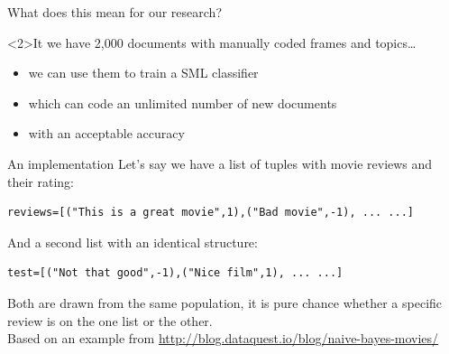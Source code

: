 \documentclass{beamer}
\begin{document}
\begin{frame}[plain]
\begin{columns}[]
\end{columns}

\end{frame}





\begin{frame}{What does this mean for our research?}
\begin{block}<2>{It we have 2,000 documents with manually coded frames and topics\ldots}
\begin{itemize}
\item we can use them to train a SML classifier
\item which can code an unlimited number of new documents
\item with an acceptable accuracy
\end{itemize}
\end{block}
\end{frame}




\begin{frame}[fragile]{An implementation}
Let's say we have a list of tuples with movie reviews and their rating:
\begin{lstlisting}
reviews=[("This is a great movie",1),("Bad movie",-1), ... ...]
\end{lstlisting}
And a second list with an identical structure:
\begin{lstlisting}
test=[("Not that good",-1),("Nice film",1), ... ...]
\end{lstlisting}
Both are drawn from the same population, it is pure chance whether a specific review is on the one list or the other.\\
\tiny{Based on an example from \url{http://blog.dataquest.io/blog/naive-bayes-movies/}}
\end{frame}
\end{document}
